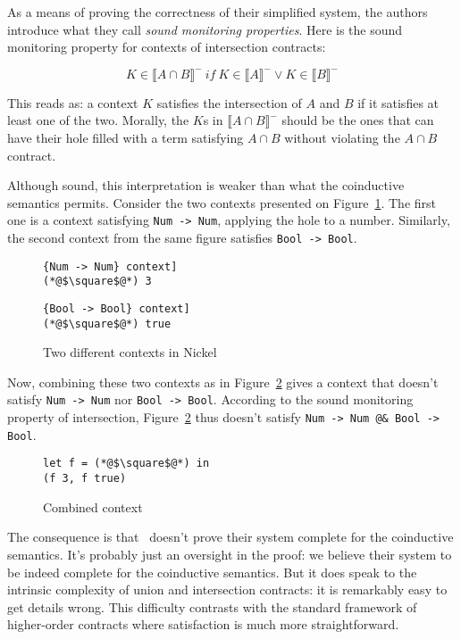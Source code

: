 \documentclass[sigplan,10pt,review,anonymous]{acmart}
\newcommand{\nickel}[1]{\lstinline[language=nickel]{#1}}
\begin{document}
As a means of proving the correctness of their simplified system, the
authors introduce what they call \emph{sound monitoring
  properties}. Here is the sound monitoring property for contexts of
intersection contracts:

$$ K \in \llbracket A \cap B \rrbracket^-~if~K \in \llbracket A \rrbracket^- \lor K \in \llbracket B \rrbracket^- $$

This reads as: a context $K$ satisfies the intersection of $A$ and $B$ if it
satisfies at least one of the two. Morally, the $K$s in $\llbracket A \cap B
\rrbracket^-$  should be the ones that can have their hole filled with a term
satisfying $A \cap B$ without violating the $A \cap B$ contract.

Although sound, this interpretation is weaker than what the
coinductive semantics permits. Consider the two contexts presented on
Figure~\ref{fig:valid-contexts}. The first one is a context satisfying
\nickel{Num -> Num}, applying the hole to a number. Similarly, the second context
from the same figure satisfies \nickel{Bool -> Bool}.

\begin{figure}[h]
\begin{lstlisting}[language=nickel, title=\nickel{Num -> Num} context]
(*@$\square$@*) 3
\end{lstlisting}
\begin{lstlisting}[language=nickel, title=\nickel{Bool -> Bool} context]
(*@$\square$@*) true
\end{lstlisting}
\caption{Two different contexts in Nickel}
\label{fig:valid-contexts}
\end{figure}

Now, combining these two contexts as in Figure~\ref{fig:invalid-context} gives a context
that doesn't satisfy \nickel{Num -> Num} nor \hbox{\nickel{Bool -> Bool}.}  According
to the sound monitoring property of intersection, Figure~\ref{fig:invalid-context} thus doesn't satisfy \nickel{Num
-> Num @& Bool -> Bool}.

\begin{figure}[h]
\begin{lstlisting}[language=nickel]
let f = (*@$\square$@*) in
(f 3, f true)
\end{lstlisting}
\caption{Combined context}
\label{fig:invalid-context}
\end{figure}

The consequence is that~\cite{RootCauseOfBlame} doesn't prove their
system complete for the coinductive semantics. It's probably just an
oversight in the proof: we believe their system to be indeed complete
for the coinductive semantics. But it does speak to the intrinsic
complexity of union and intersection contracts: it is remarkably easy
to get details wrong. This difficulty contrasts with the standard
framework of higher-order contracts where satisfaction is much more
straightforward.
\end{document}
